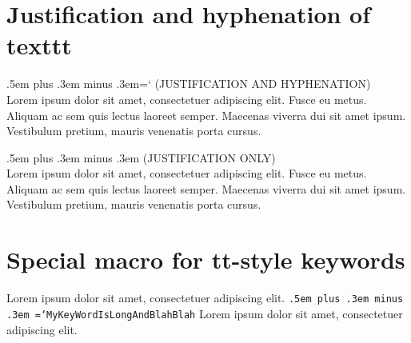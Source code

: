 \documentclass[10pt]{article}
\begin{document}
\section{Justification and hyphenation of texttt}

\begin{center}
\begin{minipage}{4cm}
\ttfamily\spaceskip .5em plus .3em minus .3em\hyphenchar\font=`\-
(JUSTIFICATION AND HYPHENATION) \\[5mm]
Lorem ipsum dolor sit amet, consectetuer adipiscing elit. Fusce eu metus. Aliquam ac sem quis lectus laoreet semper. Maecenas viverra dui sit amet ipsum. Vestibulum pretium, mauris venenatis porta cursus.
\end{minipage}
\hspace{1cm}
\begin{minipage}{4cm}
\ttfamily\spaceskip .5em plus .3em minus .3em\hyphenchar{}
(JUSTIFICATION ONLY) \\[5mm]
Lorem ipsum dolor sit amet, consectetuer adipiscing elit. Fusce eu metus. Aliquam ac sem quis lectus laoreet semper. Maecenas viverra dui sit amet ipsum. Vestibulum pretium, mauris venenatis porta cursus.
\end{minipage}

\end{center}

\section{Special macro for tt-style keywords}

\newcommand\kw[1]{%
  \texttt{\spaceskip .5em plus .3em minus .3em
    \hyphenchar\font=`\-\relax #1}} 

\begin{center}
\begin{minipage}{4cm}
Lorem ipsum dolor sit amet, consectetuer adipiscing elit. \kw{MyKeyWordIsLongAndBlahBlah} Lorem ipsum dolor sit amet, consectetuer adipiscing elit.
\end{minipage}
\end{center}
\end{document}

